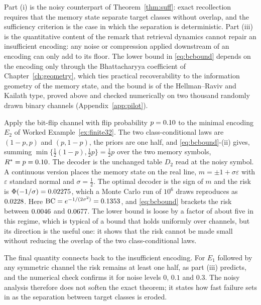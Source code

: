 Part (i) is the noisy counterpart of Theorem~\ref{thm:suff}: exact recollection requires that the memory state separate target classes without overlap, and the sufficiency criterion is the case in which the separation is deterministic. Part (iii) is the quantitative content of the remark that retrieval dynamics cannot repair an insufficient encoding: any noise or compression applied downstream of an encoding can only add to its floor. The lower bound in \eqref{eq:bcbound} depends on the encoding only through the Bhattacharyya coefficient of Chapter~\ref{ch:geometry}, which ties practical recoverability to the information geometry of the memory state, and the bound is of the Hellman--Raviv and Kailath type, proved above and checked numerically on two thousand randomly drawn binary channels (Appendix~\ref{app:pilot}).

\begin{workedex}\label{ex:noisy32}
Apply the bit-flip channel with flip probability $p=0.10$ to the minimal encoding $E_2$ of Worked Example~\ref{ex:finite32}. The two class-conditional laws are $(1-p,p)$ and $(p,1-p)$, the priors are one half, and \eqref{eq:bcbound}-(ii) gives, summing $\min\{\tfrac12(1-p),\tfrac12p\}=\tfrac12p$ over the two memory symbols, $R^\ast=p=0.10$. The decoder is the unchanged table $D_2$ read at the noisy symbol. A continuous version places the memory state on the real line, $m=\pm1+\sigma\varepsilon$ with $\varepsilon$ standard normal and $\sigma=\tfrac12$. The optimal decoder is the sign of $m$ and the risk is $\Phi(-1/\sigma)=0.02275$, which a Monte Carlo run of $10^6$ draws reproduces as $0.0228$. Here $\mathrm{BC}=e^{-1/(2\sigma^2)}=0.1353$, and \eqref{eq:bcbound} brackets the risk between $0.0046$ and $0.0677$. The lower bound is loose by a factor of about five in this regime, which is typical of a bound that holds uniformly over channels, but its direction is the useful one: it shows that the risk cannot be made small without reducing the overlap of the two class-conditional laws.
\end{workedex}

The final quantity connects back to the insufficient encoding. For $E_1$ followed by any symmetric channel the risk remains at least one half, as part (iii) predicts, and the numerical check confirms it for noise levels $0$, $0.1$ and $0.3$. The noisy analysis therefore does not soften the exact theorem; it states how fast failure sets in as the separation between target classes is eroded.


